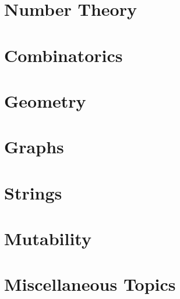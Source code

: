 \documentclass{book}
\begin{document}
\chapter{Number Theory}
\label{chap:number-theory}

\chapter{Combinatorics}
\label{chap:combinatorics}

\chapter{Geometry}
\label{chap:geometry}

\chapter{Graphs}
\label{chap:graphs}

\chapter{Strings}
\label{chap:strings}

\chapter{Mutability}
\label{chap:mutability}

\chapter{Miscellaneous Topics}
\label{chap:misc}

\printbibliography
\end{document}
